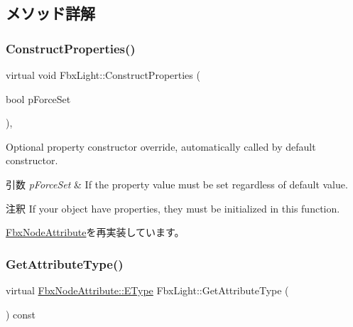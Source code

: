 \subsection{メソッド詳解}
\mbox{\label{class_fbx_light_aaa406a871272d3f36c6300ab81f312c5}} 
\subsubsection{\texorpdfstring{Construct\+Properties()}{ConstructProperties()}}
{\footnotesize\ttfamily virtual void Fbx\+Light\+::\+Construct\+Properties (\begin{DoxyParamCaption}\item[{bool}]{p\+Force\+Set }\end{DoxyParamCaption})\hspace{0.3cm}{\ttfamily [protected]}, {\ttfamily [virtual]}}

Optional property constructor override, automatically called by default constructor. 
\begin{DoxyParams}{引数}
{\em p\+Force\+Set} & If the property value must be set regardless of default value. \\
\hline
\end{DoxyParams}
\begin{DoxyRemark}{注釈}
If your object have properties, they must be initialized in this function. 
\end{DoxyRemark}


\hyperlink{class_fbx_node_attribute_a042eb9949a9b9634dcc5f126e82fd04a}{Fbx\+Node\+Attribute}を再実装しています。

\mbox{\label{class_fbx_light_a0a0ef9dd3eacb2cadb30416d13ea8e7d}} 
\subsubsection{\texorpdfstring{Get\+Attribute\+Type()}{GetAttributeType()}}
{\footnotesize\ttfamily virtual \hyperlink{class_fbx_node_attribute_a08e1669d3d1a696910756ab17de56d6a}{Fbx\+Node\+Attribute\+::\+E\+Type} Fbx\+Light\+::\+Get\+Attribute\+Type (\begin{DoxyParamCaption}{ }\end{DoxyParamCaption}) const\hspace{0.3cm}{\ttfamily [virtual]}}


